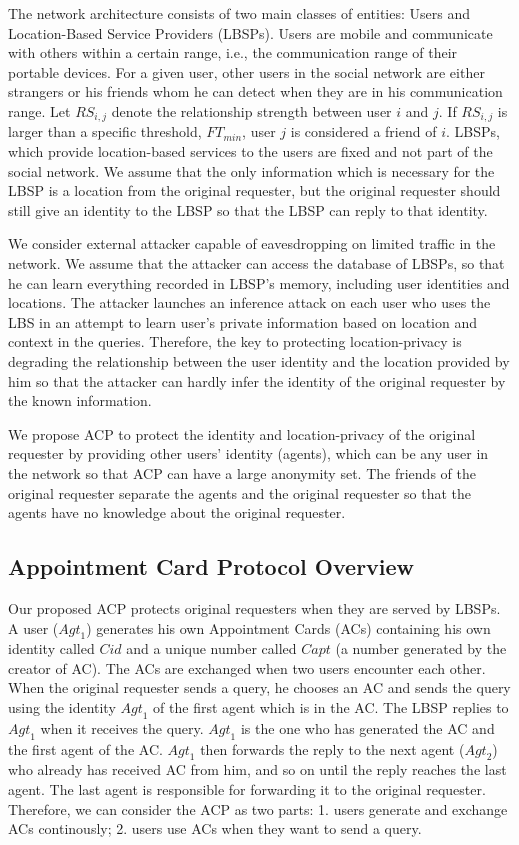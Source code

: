 \documentclass[conference]{IEEEtran}
\begin{document}
The network architecture consists of two main classes of entities: Users and Location-Based Service Providers (LBSPs). Users are mobile and communicate with others within a certain range, i.e., the communication range of their portable devices. For a given user, other users in the social network are either strangers or his friends whom he can detect when they are in his communication range. Let ${RS}_{i,j}$ denote the relationship strength \cite{C18} between user $i$ and $j$. If ${RS}_{i,j}$ is larger than a specific threshold, ${FT}_{min}$, user $j$ is considered a friend of $i$. LBSPs, which provide location-based services to the users are fixed and not part of the social network. We assume that the only information which is necessary for the LBSP is a location from the original requester, but the original requester should still give an identity to the LBSP so that the LBSP can reply to that identity.

We consider external attacker capable of eavesdropping on limited traffic in the network. We assume that the attacker can access the database of LBSPs, so that he can learn everything recorded in LBSP's memory, including user identities and locations. The attacker launches an inference attack on each user who uses the LBS in an attempt to learn user's private information based on location and context in the queries. Therefore, the key to protecting location-privacy is degrading the relationship between the user identity and the location provided by him so that the attacker can hardly infer the identity of the original requester by the known information. 

We propose ACP to protect the identity and location-privacy of the original requester by providing other users' identity (agents), which can be any user in the network so that ACP can have a large anonymity set. The friends of the original requester separate the agents and the original requester so that the agents have no knowledge about the original requester.


\subsection{ Appointment Card Protocol Overview} \label{AppCrdPrlOver}

Our proposed ACP protects original requesters when they are served by LBSPs. A user (${Agt}_{1}$) generates his own Appointment Cards (ACs) containing his own identity called $Cid$ and a unique number called $Capt$ (a number generated by the creator of AC). The ACs are exchanged when two users encounter each other. When the original requester sends a query, he chooses an AC and sends the query using the identity ${Agt}_{1}$ of the first agent which is in the AC. The LBSP replies to ${Agt}_{1}$ when it receives the query. ${Agt}_{1}$ is the one who has generated the AC and the first agent of the AC. ${Agt}_{1}$ then forwards the reply to the next agent (${Agt}_{2}$) who already has received AC from him, and so on until the reply reaches the last agent. The last agent is responsible for forwarding it to the original requester. Therefore, we can consider the ACP as two parts: 1. users generate and exchange ACs continously; 2. users use ACs when they want to send a query.
\end{document}
